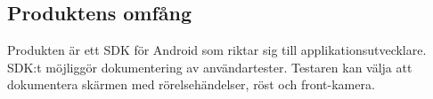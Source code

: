 \subsection{Produktens omfång}
Produkten är ett SDK för Android som riktar sig till applikationsutvecklare. SDK:t möjliggör dokumentering av användartester. Testaren kan välja att dokumentera skärmen med rörelsehändelser, röst och front-kamera.